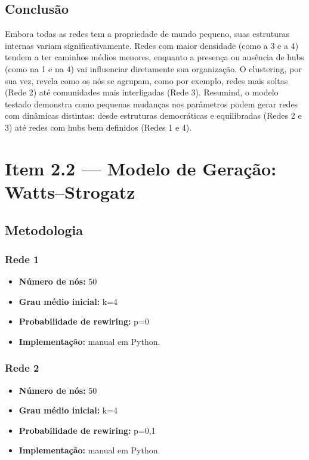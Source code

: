 \documentclass[a4paper]{article}
\begin{document}
\vspace{0.5cm}

\subsection*{Conclusão}

Embora todas as redes tem a propriedade de mundo pequeno, suas estruturas internas variam significativamente. Redes com maior densidade (como a 3 e a 4) tendem a ter caminhos médios menores, enquanto a presença ou ausência de hubs (como na 1 e na 4) vai influenciar diretamente sua organização. O clustering, por sua vez, revela como os nós se agrupam, como por exemplo, redes mais soltas (Rede 2) até comunidades mais interligadas (Rede 3).
Resumind, o modelo testado demonstra como pequenas mudanças nos parâmetros podem gerar redes com dinâmicas distintas: desde estruturas democráticas e equilibradas (Redes 2 e 3) até redes com hubs bem definidos (Redes 1 e 4).

\newpage

\section*{Item 2.2 — Modelo de Geração: Watts–Strogatz}
\subsection*{Metodologia}
\subsubsection{Rede 1}
\begin{itemize}
\item \textbf{Número de nós:} 50
\item \textbf{Grau médio inicial:} k=4
\item \textbf{Probabilidade de rewiring:} p=0
\item \textbf{Implementação:} manual em Python.
\end{itemize}

\subsubsection{Rede 2}
\begin{itemize}
\item \textbf{Número de nós:} 50
\item \textbf{Grau médio inicial:} k=4
\item \textbf{Probabilidade de rewiring:} p=0,1
\item \textbf{Implementação:} manual em Python.
\end{itemize}
\end{document}
